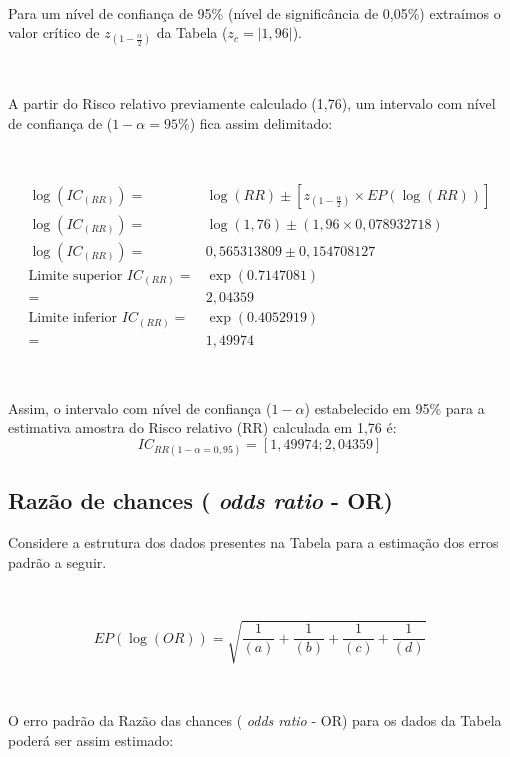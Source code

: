 \documentclass[
]{book}
\begin{document}
~

Para um nível de confiança de 95\% (nível de significância de 0,05\%) extraímos o valor crítico de \(z_{(1-\frac{\alpha}{2})}\) da Tabela (\(z_{c}=|1,96|\)).

~

A partir do Risco relativo previamente calculado (1,76), um intervalo com nível de confiança de (\(1-\alpha=95\%\)) fica assim delimitado:

~

\begin{align*}
\log(IC_{(RR)})  = & \log(RR) \pm \left[ z_{(1-\frac{\alpha}{2})} \times EP(\log(RR))\right] \\
\log(IC_{(RR)})  = & \log(1,76) \pm \left(1,96 \times 0, 078932718 \right) \\
\log(IC_{(RR)})  =  & 0,565313809 \pm 0,154708127 \\
\text{Limite superior } IC_{(RR)}  = & \exp{(0.7147081)} \\
                                   = & 2,04359 \\
\text{Limite inferior } IC_{(RR)}  = & \exp{(0.4052919)}\\
                                    = & 1,49974
\end{align*}

~

Assim, o intervalo com nível de confiança (\(1-\alpha\)) estabelecido em 95\% para a estimativa amostra do Risco relativo (RR) calculada em 1,76 é:\\

\[
IC_{RR (1-\alpha=0,95)} = [1,49974 ; 2,04359]
\]

\hfill\break

\hypertarget{razuxe3o-de-chances-odds-ratio---or}{%
\subsection{\texorpdfstring{Razão de chances ( \emph{odds ratio} - OR)}{Razão de chances ( odds ratio - OR)}}\label{razuxe3o-de-chances-odds-ratio---or}}

\hfill\break

Considere a estrutura dos dados presentes na Tabela para a estimação dos erros padrão a seguir.

~

\[
EP(\log(OR)) = \sqrt{  \frac{1}{(a)} + \frac{1}{(b)} + \frac{1}{(c)} +\frac{1}{(d)} }
\]

~

O erro padrão da Razão das chances ( \emph{odds ratio} - OR) para os dados da Tabela poderá ser assim estimado:
\end{document}
